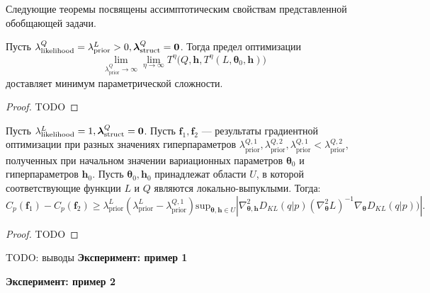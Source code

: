 Следующие теоремы посвящены ассимптотическим свойствам представленной обобщающей задачи.
\begin{theorem}
Пусть ${\lambda_{\text{likelihood}}^Q}= {\lambda_{\text{prior}}^L}>0, {\boldsymbol{\lambda}^Q_{\text{struct}} }= \bf{0}$.
Тогда предел оптимизации
\[
\lim_{{\lambda^Q_\text{prior}} \to \infty} \lim_{\eta \to \infty}   T^\eta\bigl(Q, \mathbf{h}, T^\eta(L, \boldsymbol{\theta}_0, \mathbf{h})\bigr)
\]  
доставляет минимум параметрической сложности. 
\end{theorem}
\begin{proof}
TODO
\end{proof}

\begin{theorem}
Пусть ${\lambda^L_{\text{likelihood}}} = 1 ,{\boldsymbol{\lambda}^Q_{\text{struct}}} = \bf 0$.
Пусть  $\mathbf{f}_1, \mathbf{f}_2$ --- результаты градиентной оптимизации при разных значениях гиперпараметров ${\lambda_{\text{prior}}^{Q,1},\lambda_{\text{prior}}^{Q,2}, \lambda_{\text{prior}}^{Q,1}<\lambda_{\text{prior}}^{Q,2}}$, полученных при начальном значении вариационных параметров $\boldsymbol{\theta}_0$ и гиперпараметров $\mathbf{h}_0$.
Пусть $\boldsymbol{\theta}_0, \mathbf{h}_0$ принадлежат области  $U$, в которой соответствующие функции $L$ и $Q$ являются локально-выпуклыми.
Тогда:
\[
    C_p(\mathbf{f}_1)-C_p(\mathbf{f}_2)  \geq {\lambda_\text{prior}^L(\lambda_\text{prior}^L-\lambda_\text{prior}^{Q,1})}\text{sup}_{\boldsymbol{\theta}, \mathbf{h} \in U}|\nabla^2_{\boldsymbol{\theta}, \mathbf{h}} {D_{KL}(q|p)} (\nabla^2_{\boldsymbol{\theta}} L)^{-1}   \nabla_{\boldsymbol{\theta}} {D_{KL}(q|p))}|.
\]
\end{theorem}
\begin{proof}
TODO
\end{proof}
TODO: выводы
\textbf{Эксперимент: пример 1}

\textbf{Эксперимент: пример 2}







